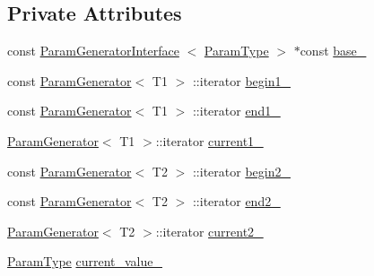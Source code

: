 \subsection*{\-Private \-Attributes}
\begin{DoxyCompactItemize}
\item 
const \hyperlink{classtesting_1_1internal_1_1ParamGeneratorInterface}{\-Param\-Generator\-Interface}\*
$<$ \hyperlink{classtesting_1_1internal_1_1CartesianProductGenerator2_aa0cb85aed1e62dc1934db8788770bedc}{\-Param\-Type} $>$ $\ast$const \hyperlink{classtesting_1_1internal_1_1CartesianProductGenerator2_1_1Iterator_a2f5d708504ba05f30b879a7ac6a7f4df}{base\-\_\-}
\item 
const \hyperlink{classtesting_1_1internal_1_1ParamGenerator}{\-Param\-Generator}$<$ \-T1 $>$\*
\-::iterator \hyperlink{classtesting_1_1internal_1_1CartesianProductGenerator2_1_1Iterator_aba04dec7b5bec40713bf241ff5d47251}{begin1\-\_\-}
\item 
const \hyperlink{classtesting_1_1internal_1_1ParamGenerator}{\-Param\-Generator}$<$ \-T1 $>$\*
\-::iterator \hyperlink{classtesting_1_1internal_1_1CartesianProductGenerator2_1_1Iterator_a45b972c744b3457f0f3cca85fa9b7a71}{end1\-\_\-}
\item 
\hyperlink{classtesting_1_1internal_1_1ParamGenerator}{\-Param\-Generator}$<$ \-T1 $>$\-::iterator \hyperlink{classtesting_1_1internal_1_1CartesianProductGenerator2_1_1Iterator_afb4e21ca790b074fd7cf4d8dc5f970cc}{current1\-\_\-}
\item 
const \hyperlink{classtesting_1_1internal_1_1ParamGenerator}{\-Param\-Generator}$<$ \-T2 $>$\*
\-::iterator \hyperlink{classtesting_1_1internal_1_1CartesianProductGenerator2_1_1Iterator_ab749158cc78e1286067212d29b4bc50f}{begin2\-\_\-}
\item 
const \hyperlink{classtesting_1_1internal_1_1ParamGenerator}{\-Param\-Generator}$<$ \-T2 $>$\*
\-::iterator \hyperlink{classtesting_1_1internal_1_1CartesianProductGenerator2_1_1Iterator_a5d6321f221328872abc05fee25994406}{end2\-\_\-}
\item 
\hyperlink{classtesting_1_1internal_1_1ParamGenerator}{\-Param\-Generator}$<$ \-T2 $>$\-::iterator \hyperlink{classtesting_1_1internal_1_1CartesianProductGenerator2_1_1Iterator_ac053dd46309cad31a636a76d5346a551}{current2\-\_\-}
\item 
\hyperlink{classtesting_1_1internal_1_1CartesianProductGenerator2_aa0cb85aed1e62dc1934db8788770bedc}{\-Param\-Type} \hyperlink{classtesting_1_1internal_1_1CartesianProductGenerator2_1_1Iterator_a1b76a85d1482a16a96efc293e8384512}{current\-\_\-value\-\_\-}
\end{DoxyCompactItemize}


